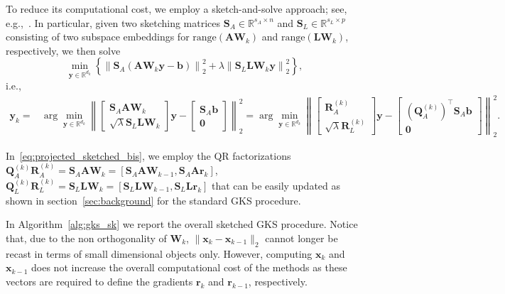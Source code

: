 \documentclass[%
  a4paper,
  onecolumn,
  colorlinks,
]{preprint}
\theoremstyle{plain}
\theoremstyle{definition}
\newcommand{\R}{\ensuremath{\mathbb{R}}}
\newcommand{\norm}[1]{\left\|#1\right\|}
\newcommand{\bA}{\ensuremath{\boldsymbol{A}}}
\newcommand{\bL}{\ensuremath{\boldsymbol{L}}}
\newcommand{\bQ}{\ensuremath{\boldsymbol{Q}}}
\newcommand{\bR}{\ensuremath{\boldsymbol{R}}}
\newcommand{\bS}{\ensuremath{\boldsymbol{S}}}
\newcommand{\bW}{\ensuremath{\boldsymbol{W}}}
\newcommand{\bb}{\mathbf{b}}
\newcommand{\br}{\mathbf{r}}
\newcommand{\by}{\mathbf{y}}
\newcommand{\bx}{\mathbf{x}}
\begin{document}
To reduce its computational cost, we employ a sketch-and-solve approach; see, e.g.,~\cite{Sarlos06, Blendenpik}. In particular, given two sketching matrices $\bS_A\in\mathbb{R}^{s_A\times n}$ and $\bS_L\in\mathbb{R}^{s_L\times p}$ consisting of two subspace embeddings for $\text{range}(\bA\bW_{k})$ and $\text{range}(\bL\bW_{k})$, respectively, we then solve 
\begin{equation}\label{eq:tik_new_sketched}
 \min_{\by \in \R^{d_k}} \left\{ \norm{\bS_A(\bA\bW_k\by - \bb)}_2^2 + \lambda\norm{\bS_L\bL\bW_k\by}_2^2 \right\},
\end{equation}
i.e., 
\begin{align}\label{eq:projected_sketched_bis}
  \by_k =&\arg\min_{\by\in\R^{d_k}}
  \left\|
 \begin{bmatrix}\bS_A\bA{\bW}_{k}\\
  \sqrt{\lambda}\bS_L\bL{\bW}_{k}\end{bmatrix}\by
  -\begin{bmatrix}\bS_A\bb\\\mathbf{0}\end{bmatrix}
  \right\|_2^2 =\arg\min_{\by\in\R^{d_k}}
  \left\|
 \begin{bmatrix}\bR_A^{(k)}\\
  \sqrt{\lambda}\bR_L^{(k)}\end{bmatrix}\by
  -\begin{bmatrix}(\bQ_A^{(k)})^\top\bS_A\bb\\\mathbf{0}\end{bmatrix}
  \right\|_2^2.
\end{align}

In~\eqref{eq:projected_sketched_bis}, we employ the QR factorizations $\bQ_A^{(k)}\bR_A^{(k)}=\bS_A\bA{\bW}_{k}=[\bS_A\bA{\bW}_{k-1},\bS_A\bA\br_{k}]$, $\bQ_L^{(k)}\bR_L^{(k)}=\bS_L\bL{\bW}_{k}=[\bS_L\bL{\bW}_{k-1},\bS_L\bL\br_{k}]$ that can be easily updated as shown in section~\ref{sec:background} for the standard GKS procedure.


In Algorithm~\ref{alg:gks_sk} we report the overall sketched GKS procedure. Notice that, due to the non orthogonality of $\bW_k$, $\|\bx_k-\bx_{k-1}\|_2$ cannot longer be recast in terms of small dimensional objects only. However, computing $\bx_k$ and $\bx_{k-1}$ does not increase the overall computational cost of the methods as these vectors are required to define the gradients $\br_{k}$ and $\br_{k-1}$, respectively.
\end{document}
